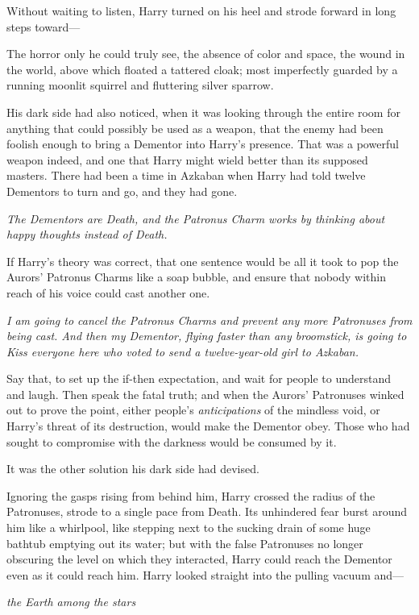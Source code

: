 Without waiting to listen, Harry turned on his heel and strode forward in long 
steps toward---

The horror only he could truly see, the absence of color and space, the wound 
in the world, above which floated a tattered cloak; most imperfectly guarded by 
a running moonlit squirrel and fluttering silver sparrow.

His dark side had also noticed, when it was looking through the entire room for 
anything that could possibly be used as a weapon, that the enemy had been 
foolish enough to bring a Dementor into Harry's presence. That was a powerful 
weapon indeed, and one that Harry might wield better than its supposed masters. 
There had been a time in Azkaban when Harry had told twelve Dementors to turn 
and go, and they had gone.

\emph{The Dementors are Death, and the Patronus Charm works by thinking about 
happy thoughts instead of Death.}

If Harry's theory was correct, that one sentence would be all it took to pop 
the Aurors' Patronus Charms like a soap bubble, and ensure that nobody within 
reach of his voice could cast another one.

\emph{I am going to cancel the Patronus Charms and prevent any more Patronuses 
from being cast. And then my Dementor, flying faster than any broomstick, is 
going to Kiss everyone here who voted to send a twelve-year-old girl to 
Azkaban.}

Say that, to set up the if-then expectation, and wait for people to understand 
and laugh. Then speak the fatal truth; and when the Aurors' Patronuses winked 
out to prove the point, either people's \emph{anticipations} of the mindless 
void, or Harry's threat of its destruction, would make the Dementor obey. Those 
who had sought to compromise with the darkness would be consumed by it.

It was the other solution his dark side had devised.

Ignoring the gasps rising from behind him, Harry crossed the radius of the 
Patronuses, strode to a single pace from Death. Its unhindered fear burst 
around him like a whirlpool, like stepping next to the sucking drain of some 
huge bathtub emptying out its water; but with the false Patronuses no longer 
obscuring the level on which they interacted, Harry could reach the Dementor 
even as it could reach him. Harry looked straight into the pulling vacuum and---

\emph{the Earth among the stars}

